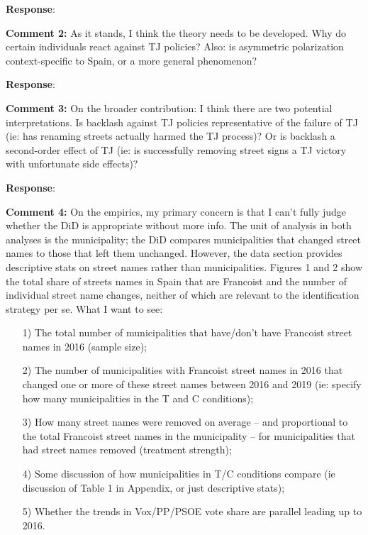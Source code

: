 \documentclass[12pt, a4paper, notitlepage]{article}
\begin{document}
\textbf{Response}: {\color{red}{pending}}

\textbf{Comment 2:} As it stands, I think the theory needs to be developed. Why do certain individuals react against TJ policies? Also: is asymmetric polarization context-specific to Spain, or a more general phenomenon?

\textbf{Response}: {\color{red}{pending}}

\textbf{Comment 3:} On the broader contribution: I think there are two potential interpretations. Is backlash against TJ policies representative of the failure of TJ (ie: has renaming streets actually harmed the TJ process)? Or is backlash a second-order effect of TJ (ie: is successfully removing street signs a TJ victory with unfortunate side effects)?

\textbf{Response}: {\color{red}{pending}}

\textbf{Comment 4:} On the empirics, my primary concern is that I can’t fully judge whether the DiD is appropriate without more info. The unit of analysis in both analyses is the municipality; the DiD compares municipalities that changed street names to those that left them unchanged. However, the data section provides descriptive stats on street names rather than municipalities. Figures 1 and 2 show the total share of streets names in Spain that are Francoist and the number of individual street name changes, neither of which are relevant to the identification strategy per se. What I want to see:
\begin{itemize}
  \item[1)] The total number of municipalities that have/don’t have Francoist street names in 2016 (sample size);
  \item[2)] The number of municipalities with Francoist street names in 2016 that changed one or more of these street names between 2016 and 2019 (ie: specify how many municipalities in the T and C conditions);
  \item[3)] How many street names were removed on average – and proportional to the total Francoist street names in the municipality -- for municipalities that had street names removed (treatment strength);
  \item[4)] Some discussion of how municipalities in T/C conditions compare (ie discussion of Table 1 in Appendix, or just descriptive stats);
  \item[5)] Whether the trends in Vox/PP/PSOE vote share are parallel leading up to 2016.
\end{itemize}
\end{document}
